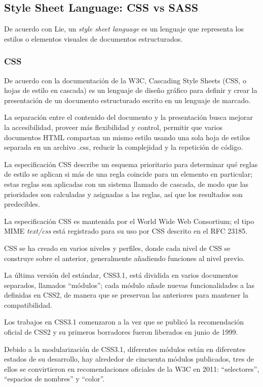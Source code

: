 \subsection{Style Sheet Language: CSS vs SASS}
De acuerdo con Lie\cite{lie_cascading_2005}, un \textit{style sheet language} es un lenguaje que representa los estilos o elementos visuales de documentos estructurados.

\subsubsection*{CSS}
De acuerdo con la documentación de la W3C\cite{noauthor_what_nodate}, Cascading Style Sheets (CSS, o hojas de estilo en cascada) es un lenguaje de diseño gráfico para definir y crear la presentación de un documento estructurado escrito en un lenguaje de marcado.


La separación entre el contenido del documento y la presentación busca mejorar la accesibilidad, proveer más flexibilidad y control, permitir que varios documentos HTML compartan un mismo estilo usando una sola hoja de estilos separada en un archivo .css, reducir la complejidad y la repetición de código.


La especificación CSS describe un esquema prioritario para determinar qué reglas de estilo se aplican si más de una regla coincide para un elemento en particular; estas reglas son aplicadas con un sistema llamado de cascada, de modo que las prioridades son calculadas y asignadas a las reglas, así que los resultados son predecibles.


La especificación CSS es mantenida por el World Wide Web Consortium; el tipo MIME \textit{text/css} está registrado para su uso por CSS descrito en el RFC 23185​. 


CSS se ha creado en varios niveles y perfiles, donde cada nivel de CSS se construye sobre el anterior, generalmente añadiendo funciones al nivel previo.


La última versión del estándar, CSS3.1, está dividida en varios documentos separados, llamados ``módulos''; cada módulo añade nuevas funcionalidades a las definidas en CSS2, de manera que se preservan las anteriores para mantener la compatibilidad.


Los trabajos en CSS3.1 comenzaron a la vez que se publicó la recomendación oficial de CSS2 y su primeros borradores fueron liberados en junio de 1999.


Debido a la modularización de CSS3.1, diferentes módulos están en diferentes estados de su desarrollo,​ hay alrededor de cincuenta módulos publicados,​ tres de ellos se convirtieron en recomendaciones oficiales de la W3C en 2011: ``selectores'', ``espacios de nombres'' y ``color''.


